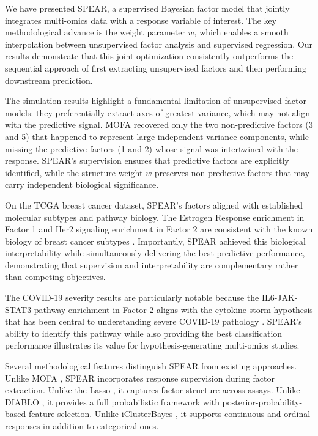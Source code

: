 \documentclass[11pt]{article}
\begin{document}
We have presented SPEAR, a supervised Bayesian factor model that jointly integrates multi-omics data with a response variable of interest. The key methodological advance is the weight parameter $w$, which enables a smooth interpolation between unsupervised factor analysis and supervised regression. Our results demonstrate that this joint optimization consistently outperforms the sequential approach of first extracting unsupervised factors and then performing downstream prediction.

The simulation results highlight a fundamental limitation of unsupervised factor models: they preferentially extract axes of greatest variance, which may not align with the predictive signal. MOFA recovered only the two non-predictive factors (3 and 5) that happened to represent large independent variance components, while missing the predictive factors (1 and 2) whose signal was intertwined with the response. SPEAR's supervision ensures that predictive factors are explicitly identified, while the structure weight $w$ preserves non-predictive factors that may carry independent biological significance.

On the TCGA breast cancer dataset, SPEAR's factors aligned with established molecular subtypes and pathway biology. The Estrogen Response enrichment in Factor 1 and Her2 signaling enrichment in Factor 2 are consistent with the known biology of breast cancer subtypes \citep{tcga2012breast}. Importantly, SPEAR achieved this biological interpretability while simultaneously delivering the best predictive performance, demonstrating that supervision and interpretability are complementary rather than competing objectives.

The COVID-19 severity results are particularly notable because the IL6-JAK-STAT3 pathway enrichment in Factor 2 aligns with the cytokine storm hypothesis that has been central to understanding severe COVID-19 pathology \citep{overmyer2021covid}. SPEAR's ability to identify this pathway while also providing the best classification performance illustrates its value for hypothesis-generating multi-omics studies.

Several methodological features distinguish SPEAR from existing approaches. Unlike MOFA \citep{argelaguet2018mofa}, SPEAR incorporates response supervision during factor extraction. Unlike the Lasso \citep{tibshirani1996lasso}, it captures factor structure across assays. Unlike DIABLO \citep{singh2019diablo}, it provides a full probabilistic framework with posterior-probability-based feature selection. Unlike iClusterBayes \citep{mo2018iclusterbayes}, it supports continuous and ordinal responses in addition to categorical ones.
\end{document}
